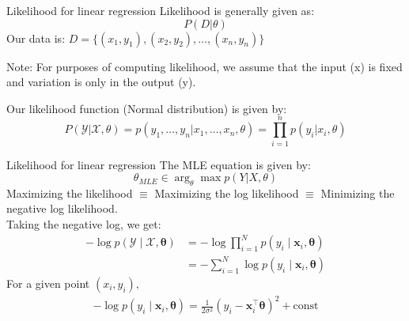 \documentclass{beamer}
\begin{document}
\begin{frame}{Likelihood for linear regression}
    Likelihood is generally given as: 
    \begin{equation}
        P(D|\theta) 
    \end{equation}
    \vspace{10pt}
    \pause Our data is: $D = \{(x_1, y_1), (x_2,y_2), \ldots, (x_n, y_n)\}$
    \vspace{10pt}

    \pause Note: For purposes of computing likelihood, we assume that the input (x) is fixed and variation is only in the output (y).

    \vspace{10pt}
    \pause Our likelihood function (Normal distribution) is given by:
    \begin{equation}
    P(\mathcal{Y}|\mathcal{X},\theta) = p(y_1,\ldots,y_n|x_1,\ldots,x_n,\theta) = \prod_{i=1}^n p(y_i|x_i, \theta) 
    \end{equation}
\end{frame}
    
\begin{frame}{Likelihood for linear regression}
    The MLE equation is given by:
    \begin{equation}
        \theta_{MLE}\in \arg_{\theta} \max p(Y|X,\theta)
    \end{equation}
    \pause Maximizing the likelihood $\equiv$ Maximizing the log likelihood $\equiv$ Minimizing the negative log likelihood.\\
    \pause Taking the negative log, we get:
    \vspace{10pt}
    \pause \begin{align*}
        -\log p(\mathcal{Y} \mid \mathcal{X}, \boldsymbol{\theta}) &= -\log \prod_{i=1}^N p(y_i \mid \boldsymbol{x}_i, \boldsymbol{\theta}) \\
        &= -\sum_{i=1}^N \log p(y_i \mid \boldsymbol{x}_i, \boldsymbol{\theta})
    \end{align*}
    \pause For a given point $(x_i, y_i),$
    \pause \begin{align*}
        -\log p(y_i \mid \boldsymbol{x}_i, \boldsymbol{\theta}) = \frac{1}{2 \sigma^2} \left(y_i - \boldsymbol{x}_i^{\top} \boldsymbol{\theta}\right)^2 + \text{const}
    \end{align*}
    \end{frame}
    
\end{document}
